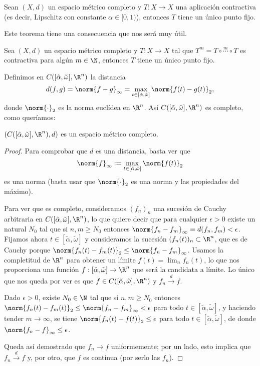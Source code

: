 \documentclass[../main.tex]{subfiles}
\begin{document}
\begin{theorem}
  Sean \((X, d)\) un espacio métrico completo y \(T : X \to X\) una aplicación
  contractiva (es decir, Lipschitz con constante \(\alpha \in [0, 1)\)), entonces
  \(T\) tiene un único punto fijo.
\end{theorem}

Este teorema tiene una consecuencia que nos será muy útil.

\begin{corollary}
	Sea \((X, d)\) un espacio métrico completo y \(T : X \to X\) tal que 
	\(T^m = T \circ \overset{m}{\cdots} \circ T\) es contractiva para algún
	\(m \in \N\), entonces \(T\) tiene un único punto fijo.
\end{corollary}

Definimos en \(C([\tilde{\alpha}, \tilde{\omega}], \R^n)\) la distancia 
\[d(f, g) = \norm{f - g}_{\infty} = \max_{t \in [\tilde{\alpha},
    \tilde{\omega}]} \norm{f(t) - g(t)}_2,\] donde \(\norm{\cdot}_2\) es la
norma euclídea en \(\R^n\). Así \(C([\tilde{\alpha}, \tilde{\omega}], \R^n)\)
es completo, como queríamos:

\begin{proposition}
  \(\left( C([\tilde{\alpha}, \tilde{\omega}], \R^n), d \right)\) es un espacio
  métrico completo.
  \begin{proof}
    Para comprobar que \(d\) es una distancia, basta ver que
    \[\norm{f}_\infty := \max_{t \in [\tilde{\alpha}, \tilde{\omega}]}
      \norm{f(t)}_2\]
    es una norma (basta usar que \(\norm{\cdot}_2\) es una norma y las
    propiedades del máximo).

   Para ver que es completo, consideramos \((f_n)_n\) una sucesión de Cauchy
   arbitraria en \(C([\tilde{\alpha}, \tilde{\omega}], \R^n)\), lo que quiere
   decir que para cualquier \(\epsilon > 0\) existe un natural \(N_0\) tal que
   si \(n, m \geq N_0\) entonces
   \(\norm{f_n-f_m}_\infty = d(f_n, f_m) < \epsilon\). Fijamos ahora
   \(t \in [\tilde{\alpha}, \tilde{\omega}]\) y consideramos la sucesión
   \((f_n(t))_n \subset \R^n\), que es de Cauchy porque
   \(\norm{f_n(t) - f_m(t)}_2 \leq \norm{f_n - f_m}_\infty\). Usamos la
   completitud de \(\R^n\) para obtener un límite \(f(t) = \lim_n f_n(t)\), lo
   que nos proporciona una función \(f: [\tilde{\alpha}, \tilde{\omega}] \to
   \R^n\) que será la candidata a límite. Lo único que nos queda por ver es que
   \(f \in C([\tilde{\alpha}, \tilde{\omega}], \R^n)\) y \(f_n \overset{d}{\to} f\).

   Dado \(\epsilon > 0\), existe \(N_0 \in \N\) tal que si \(n, m \geq N_0\)
   entonces \(\norm{f_n(t) - f_m(t)}_2 \leq \norm{f_n - f_m}_\infty < \epsilon\)
   para todo \(t \in [\tilde{\alpha}, \tilde{\omega}]\), y haciendo tender
   \(m \to \infty\), se tiene \(\norm{f_n(t) - f(t)}_2 \leq \epsilon\) para todo
   \(t \in [\tilde{\alpha}, \tilde{\omega}]\), de donde
   \(\norm{f_n-f}_\infty \leq \epsilon\).

   Queda así demostrado que \(f_n \to f\) uniformemente; por un lado, esto
   implica que \(f_n \overset{d}{\to} f\) y, por otro, que \(f\) es continua
   (por serlo las \(f_n\)).
  \end{proof}
\end{proposition}
\end{document}
